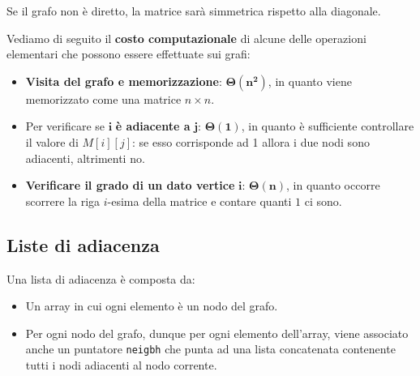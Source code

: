 \documentclass[12pt]{report}
\begin{document}
	Se il grafo non è diretto, la matrice sarà simmetrica rispetto alla diagonale.
	
	Vediamo di seguito il \textbf{costo computazionale} di alcune delle operazioni elementari che possono essere effettuate sui grafi:
	\begin{itemize}
		\item \textbf{Visita del grafo e memorizzazione}: $\mathbf{\Theta(n^2)}$, in quanto viene memorizzato come una matrice $n \times n$.
		
		\item Per verificare se $\mathbf{i}$ \textbf{è adiacente a} $\mathbf{j}$: $\mathbf{\Theta(1)}$, in quanto è sufficiente controllare il valore di $M[i][j]$: se esso corrisponde ad 1 allora i due nodi sono adiacenti, altrimenti no.
		
		\item \textbf{Verificare il grado di un dato vertice} $\mathbf{i}$: $\mathbf{\Theta(n)}$, in quanto occorre scorrere la riga $i$-esima della matrice e contare quanti $1$ ci sono.
	\end{itemize}
	
	\subsection{Liste di adiacenza}
	Una lista di adiacenza è composta da:
	\begin{itemize}
		\item Un array in cui ogni elemento è un nodo del grafo.
		
		\item Per ogni nodo del grafo, dunque per ogni elemento dell'array, viene associato anche un puntatore \texttt{neigbh} che punta ad una lista concatenata contenente tutti i nodi adiacenti al nodo corrente.
	\end{itemize}
	
\end{document}
